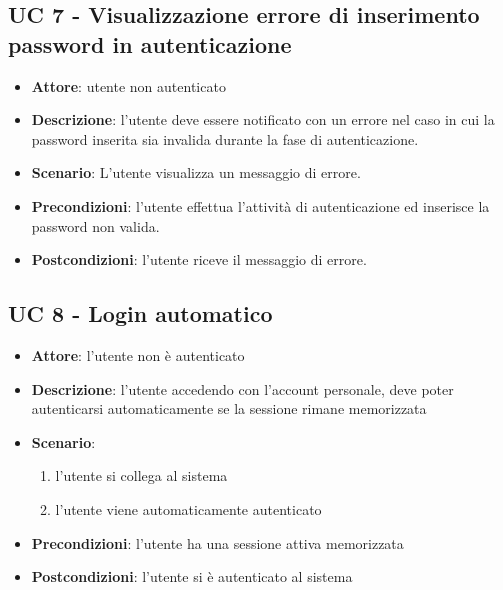 \subsection{UC 7 - Visualizzazione errore di inserimento password in autenticazione} 
\begin{itemize}
    \item \textbf{Attore}: utente non autenticato
    \item \textbf{Descrizione}: l’utente deve essere notificato con un errore nel caso in cui la password inserita sia invalida durante la fase di autenticazione.
    \item \textbf{Scenario}: L’utente visualizza un messaggio di errore. 
    \item \textbf{Precondizioni}: l’utente effettua l’attività di autenticazione ed inserisce la password non valida.
    \item \textbf{Postcondizioni}: l’utente riceve il messaggio di errore.
\end{itemize}

\subsection{UC 8 - Login automatico}
\begin{itemize}
\item \textbf{Attore}: l’utente non è autenticato 
\item \textbf{Descrizione}: l’utente accedendo con l’account personale, deve poter autenticarsi automaticamente se la sessione rimane memorizzata
\item \textbf{Scenario}:
    \begin{enumerate}
        \item l’utente si collega al sistema 
        \item l’utente viene automaticamente autenticato 
    \end{enumerate}
\item \textbf{Precondizioni}: l’utente ha una sessione attiva memorizzata
\item \textbf{Postcondizioni}: l’utente si è autenticato al sistema
\end{itemize}

